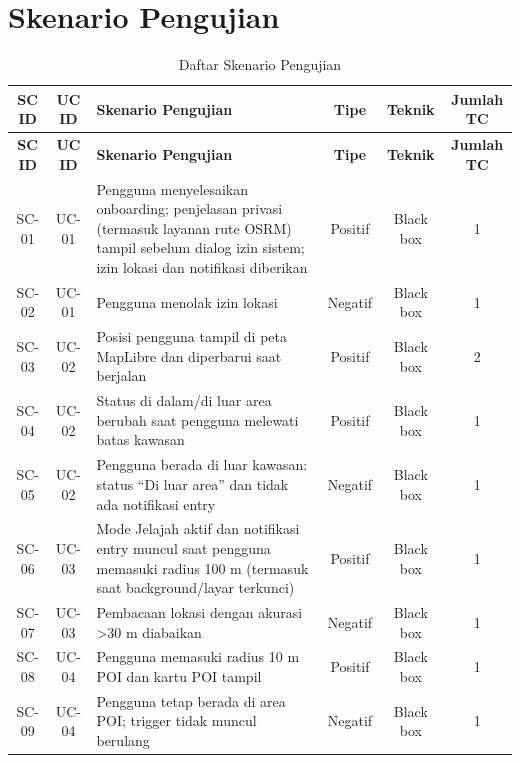 \chapter{Skenario Pengujian}
\label{bab:skenario-pengujian}

\begin{longtable}{|C{0.09}|C{0.09}|L{0.48}|C{0.11}|C{0.13}|C{0.10}|}
\caption{Daftar Skenario Pengujian}\\
\hline
{}\textbf{SC ID} & \textbf{UC ID} & \textbf{Skenario Pengujian} & \textbf{Tipe} & \textbf{Teknik} & \textbf{Jumlah TC} \\ \hline
\endfirsthead
\hline
{}\textbf{SC ID} & \textbf{UC ID} & \textbf{Skenario Pengujian} & \textbf{Tipe} & \textbf{Teknik} & \textbf{Jumlah TC} \\ \hline
\endhead
SC-01 & UC-01 & Pengguna menyelesaikan onboarding; penjelasan privasi (termasuk layanan rute OSRM) tampil sebelum dialog izin sistem; izin lokasi dan notifikasi diberikan & Positif & Black box & 1 \\ \hline
SC-02 & UC-01 & Pengguna menolak izin lokasi & Negatif & Black box & 1 \\ \hline
SC-03 & UC-02 & Posisi pengguna tampil di peta MapLibre dan diperbarui saat berjalan & Positif & Black box & 2 \\ \hline
SC-04 & UC-02 & Status di dalam/di luar area berubah saat pengguna melewati batas kawasan & Positif & Black box & 1 \\ \hline
SC-05 & UC-02 & Pengguna berada di luar kawasan: status ``Di luar area'' dan tidak ada notifikasi entry & Negatif & Black box & 1 \\ \hline
SC-06 & UC-03 & Mode Jelajah aktif dan notifikasi entry muncul saat pengguna memasuki radius 100 m (termasuk saat background/layar terkunci) & Positif & Black box & 1 \\ \hline
SC-07 & UC-03 & Pembacaan lokasi dengan akurasi >30 m diabaikan & Negatif & Black box & 1 \\ \hline
SC-08 & UC-04 & Pengguna memasuki radius 10 m POI dan kartu POI tampil & Positif & Black box & 1 \\ \hline
SC-09 & UC-04 & Pengguna tetap berada di area POI; trigger tidak muncul berulang & Negatif & Black box & 1 \\ \hline

\end{longtable}
